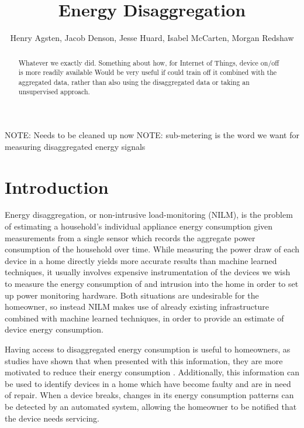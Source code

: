 \documentclass{article}
\title{Energy Disaggregation}
\author{Henry Agsten, Jacob Denson, Jesse Huard, Isabel McCarten, Morgan Redshaw}
\date{}
\begin{document}
\maketitle

\begin{abstract}
Whatever we exactly did. Something about how, for Internet of Things, device on/off is more readily available
Would be very useful if could train off it combined with the aggregated data, rather than also using the disaggregated data or taking an unsupervised approach.
\end{abstract}

NOTE: Needs to be cleaned up now
NOTE: sub-metering is the word we want for measuring disaggregated energy signals

\section{Introduction}

Energy disaggregation, or non-intrusive load-monitoring (NILM), is the problem of estimating a household's individual appliance energy consumption given measurements from a single sensor which records the aggregate power consumption of the household over time.
While measuring the power draw of each device in a home directly yields more accurate results than machine learned techniques, it usually involves expensive instrumentation of the devices we wish to measure the energy consumption of and intrusion into the home in order to set up power monitoring hardware.
Both situations are undesirable for the homeowner, so instead NILM makes use of already existing infrastructure combined with machine learned techniques, in order to provide an estimate of device energy consumption.

Having access to disaggregated energy consumption is useful to homeowners, as studies have shown that when presented with this information, they are more motivated to reduce their energy consumption \cite{Darby}.
Additionally, this information can be used to identify devices in a home which have become faulty and are in need of repair.
When a device breaks, changes in its energy consumption patterns can be detected by an automated system, allowing the homeowner to be notified that the device needs servicing.
\end{document}
